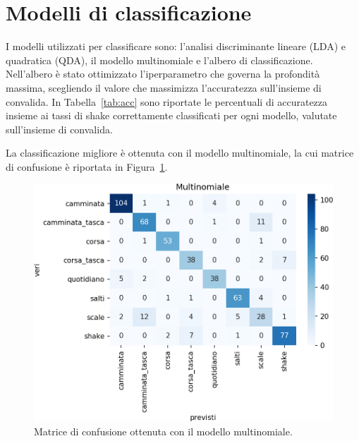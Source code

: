 \documentclass[main.tex]{subfiles}
\begin{document}
\section{Modelli di classificazione}
I modelli utilizzati per classificare sono: l'analisi discriminante lineare (LDA) e quadratica (QDA), il modello multinomiale e l'albero di classificazione. Nell'albero è stato ottimizzato l'iperparametro che governa la profondità massima, scegliendo il valore che massimizza l'accuratezza sull'insieme di convalida. In Tabella~\ref{tab:acc} sono riportate le percentuali di accuratezza insieme ai tassi di shake correttamente classificati per ogni modello, valutate sull'insieme di convalida.


La classificazione migliore è ottenuta con il modello multinomiale, la cui matrice di confusione è riportata in Figura~\ref{fig:mn}.
\begin{figure}[H]
	\centering
	\includegraphics[width=\confusion]{../../figure/confusionMatrix-Mn.png}
	\caption{Matrice di confusione ottenuta con il modello multinomiale.}
	\label{fig:mn}
\end{figure}
\end{document}
